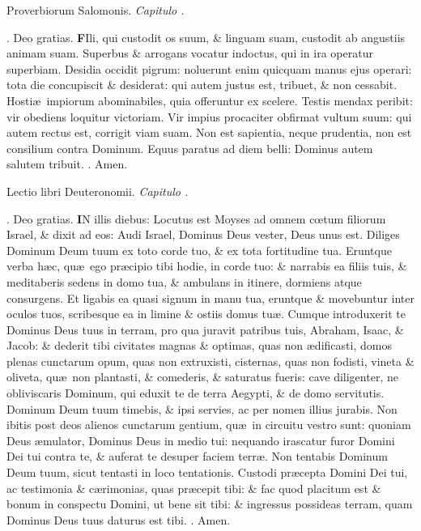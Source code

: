 \documentclass[letter,11pt]{book}
\makeatletter
\DeclareRobustCommand{\Rbar}{\vers@resp{0pt}{R}}
\newcommand{\vers@resp@sym}{\raisebox{0.2ex}{\rotatebox[origin=c]{-20}{$\m@th\rceil$}}}
\newcommand{\vers@resp}[2]{%
  {\ooalign{\hidewidth\kern#1\vers@resp@sym\hidewidth\cr#2\cr}}%
}%
\def\R{\color{Red} \Rbar . \color{black}}
\makeatother
\begin{document}
\begin{multicols*}{2}
\vspace{-.5em} \begin{center} {\color{Red} P}roverbiorum Salomonis. \itshape Capitulo . \color{black} \end{center} \vspace{-.5em}
\par \noindent \R Deo gratias.
\lettrine[lines=2]{\bfseries \color{Red} F}{}Ili, qui custodit os suum, \& linguam suam, custodit ab angustiis animam suam. Superbus \& arrogans vocatur indoctus, qui in ira operatur superbiam. Desidia occidit pigrum: noluerunt enim quicquam manus ejus operari: tota die concupiscit \& desiderat: qui autem justus est, tribuet, \& non cessabit. Hosti\ae \ impiorum abominabiles, quia offeruntur ex scelere. Testis mendax peribit: vir obediens loquitur victoriam. Vir impius procaciter obfirmat vultum suum: qui autem rectus est, corrigit viam suam. Non est sapientia, neque prudentia, non est consilium contra Dominum. Equus paratus ad diem belli: Dominus autem salutem tribuit. \R Amen.
\vspace{-.5em} \begin{center} {\color{Red} L}ectio libri Deuteronomii. \itshape Capitulo . \color{black} \end{center} \vspace{-.5em}
\par \noindent \R Deo gratias.
\lettrine[lines=2]{\bfseries \color{Red} I}{}N illis diebus: Locutus est Moyses ad omnem c\oe tum filiorum Israel, \& dixit ad eos: Audi Israel, Dominus Deus vester, Deus unus est. Diliges Dominum Deum tuum ex toto corde tuo, \& ex tota fortitudine tua. Eruntque verba h\ae c, qu\ae \ ego pr\ae cipio tibi hodie, in corde tuo: \& narrabis ea filiis tuis, \& meditaberis sedens in domo tua, \& ambulans in itinere, dormiens atque consurgens. Et ligabis ea quasi signum in manu tua, eruntque \& movebuntur inter oculos tuos, scribesque ea in limine \& ostiis domus tu\ae . Cumque introduxerit te Dominus Deus tuus in terram, pro qua juravit patribus tuis, Abraham, Isaac, \& Jacob: \& dederit tibi civitates magnas \& optimas, quas non \ae dificasti, domos plenas cunctarum opum, quas non extruxisti, cisternas, quas non fodisti, vineta \& oliveta, qu\ae \ non plantasti, \& comederis, \& saturatus fueris: cave diligenter, ne obliviscaris Dominum, qui eduxit te de terra Aegypti, \& de domo servitutis. Dominum Deum tuum timebis, \& ipsi servies, ac per nomen illius jurabis. Non ibitis post deos alienos cunctarum gentium, qu\ae \ in circuitu vestro sunt: quoniam Deus \ae mulator, Dominus Deus in medio tui: nequando irascatur furor Domini Dei tui contra te, \& auferat te desuper faciem terr\ae . Non tentabis Dominum Deum tuum, sicut tentasti in loco tentationis. Custodi pr\ae cepta Domini Dei tui, ac testimonia \& c\ae rimonias, quas pr\ae cepit tibi: \& fac quod placitum est \& bonum in conspectu Domini, ut bene sit tibi: \& ingressus possideas terram, quam Dominus Deus tuus daturus est tibi. \R Amen.

\end{multicols*}
\end{document}
